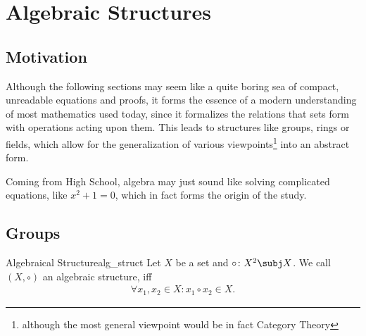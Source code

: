 \section{Algebraic Structures}\label{sec:alg_structures}

\subsection*{Motivation}\label{ssec:alg_motivation}

Although the following sections may seem like a quite boring sea of compact, unreadable equations and proofs, it forms
the essence of a modern understanding of most mathematics used today, since it formalizes the relations that sets form
with operations acting upon them. This leads to structures like groups, rings or fields, which allow for the 
generalization of various viewpoints\footnote{although the most general viewpoint would be in fact 
Category Theory} into an abstract form. 

Coming from High School, algebra may just sound like solving 
complicated equations, like $x^2 + 1 = 0$, which in fact forms the origin of the study.

\subsection{Groups}\label{ssec:groups}

\begin{definition}{Algebraical Structure}{alg_struct}
    Let $X$ be a set and $\circ\colon X^2\subj X$. We call $(X,\circ)$ an algebraic structure, iff
    \begin{align}
        \forall x_1,x_2 \in X\colon x_1\circ x_2 \in X.\label{eq:def_alg_struct}
    \end{align}
\end{definition}

